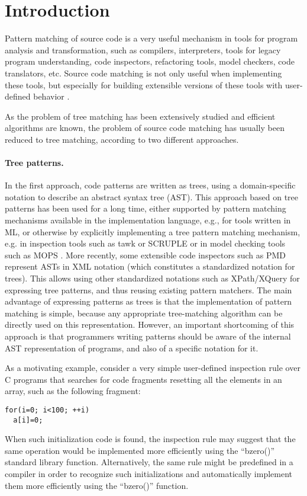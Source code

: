 
\section{Introduction}
Pattern matching of source code is a very useful mechanism in tools
for program analysis and transformation, such as compilers,
interpreters, tools for legacy program understanding, code inspectors,
refactoring tools, model checkers, code translators, etc. Source code
matching is not only useful when implementing these tools, but
especially for building extensible versions of these tools with
user-defined behavior \cite{mc, mj, mops, blast, mygcc, pmd}.

As the problem of tree matching has been
extensively studied and efficient algorithms are known, the problem of
source code matching has usually been reduced to tree matching,
according to two different approaches.

\paragraph{Tree patterns.}
In the first approach, code patterns are written as trees, using a
domain-specific notation to describe an abstract syntax tree
(AST). This approach based on tree patterns has been used for a long
time, either supported by pattern matching mechanisms available in the
implementation language, e.g., for tools written in ML, or otherwise
by explicitly implementing a tree pattern matching mechanism, e.g. in
inspection tools such as tawk \cite{tawk} or SCRUPLE \cite{scruple} or
in model checking tools such as MOPS \cite{mops}. More recently, some
extensible code inspectors such as PMD \cite{pmd} represent ASTs in
XML notation (which constitutes a standardized notation for
trees). This allows using other standardized notations such as
XPath/XQuery for expressing tree patterns, and thus reusing existing
pattern matchers. The main advantage of expressing patterns as trees
is that the implementation of pattern matching is simple, because any
appropriate tree-matching algorithm can be directly used on this
representation. However, an important shortcoming of this approach is
that programmers writing patterns should be aware of the internal AST
representation of programs, and also of a specific notation for it.

As a motivating example, consider a very simple user-defined
inspection rule over C programs that searches for code fragments
resetting all the elements in an array, such as the following
fragment:
\begin{verbatim}
for(i=0; i<100; ++i)
  a[i]=0;
\end{verbatim}
When such initialization code is found, the inspection rule may
suggest that the same operation would be implemented more efficiently
using the ``bzero()'' standard library function. Alternatively, the
same rule might be predefined in a compiler in order to recognize such
initializations and automatically implement them more efficiently
using the ``bzero()'' function.

